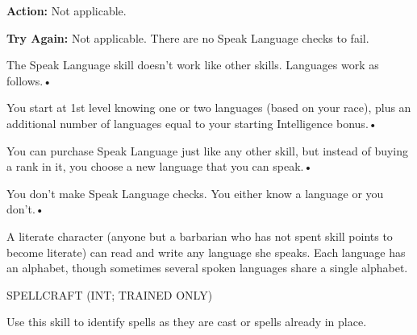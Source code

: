 \documentclass{article}
\begin{document}
\vspace{12pt}
\textbf{Action:} Not applicable.

\textbf{Try Again:} Not applicable. There are no Speak Language checks to fail.

The Speak Language skill doesn't work like other skills. Languages work as follows.• 

\parindent=3pt
You start at 1st level knowing one or two languages (based on your race), plus 
an additional number of languages equal to your starting Intelligence bonus.• 

You can purchase Speak Language just like any other skill, but instead of buying 
a rank in it, you choose a new language that you can speak.• 

\parindent=7pt
You don't make Speak Language checks. You either know a language or you don't.• 

\parindent=3pt
A literate character (anyone but a barbarian who has not spent skill points to 
become literate) can read and write any language she speaks. Each language has 
an alphabet, though sometimes several spoken languages share a single alphabet.

\vspace{12pt}
\parindent=0pt
SPELLCRAFT (INT; TRAINED ONLY)

Use this skill to identify spells as they are cast or spells already in place.
\end{document}
